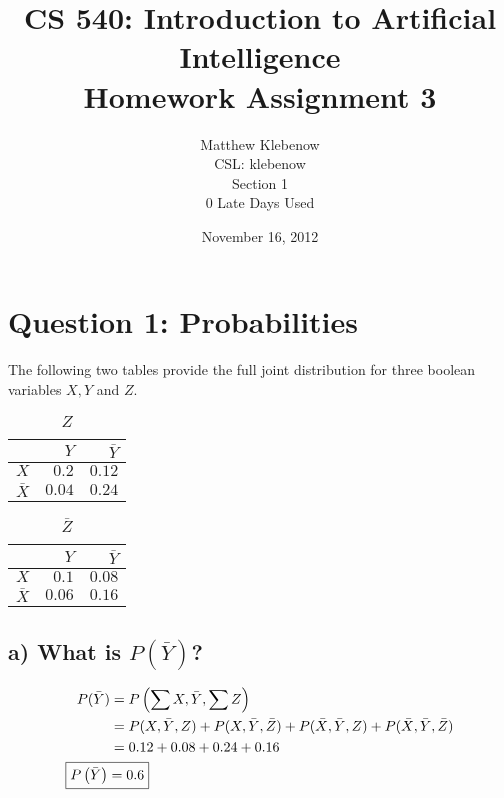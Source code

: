 \documentclass[12pt,letterpaper]{article}
\author{Matthew Klebenow\\CSL: klebenow\\Section 1\\0 Late Days Used}
\title{CS 540: Introduction to Artificial Intelligence \\ Homework Assignment 3}
\date{November 16, 2012}
\begin{document}
\maketitle
\tableofcontents
\pagebreak
\section{Question 1: Probabilities}
The following two tables provide the full joint distribution for three boolean variables $X,Y$ and $Z$.
\begin{table}[htbp]
  \centering
  \caption{$Z$}
    \begin{tabular}{rrr}
    \toprule
          & $Y$     & $\bar{Y}$ \\
    \midrule
    $X$     & $0.2$   & $0.12$ \\
    $\bar{X}$ & $0.04$  & $0.24$ \\
    \bottomrule
    \end{tabular}%
  \label{tab:ztable}%
\end{table}%
\begin{table}[htbp]
  \centering
  \caption{$\bar{Z}$}
    \begin{tabular}{rrr}
    \toprule
          & $Y$     & $\bar{Y}$ \\
    \midrule
    $X$     & $0.1$   & $0.08$ \\
    $\bar{X}$ & $0.06$  & $0.16$ \\
    \bottomrule
    \end{tabular}%
  \label{tab:notztable}%
\end{table}%
\subsection{a) What is $P\left(\bar{Y}\right)$?}
\begin{align*}
P(\bar{Y}) &= P\left(\sum{X},\bar{Y},\sum{Z}\right)\\
&= P(X,\bar{Y},Z) + P(X,\bar{Y},\bar{Z}) + P(\bar{X},\bar{Y},Z) + P(\bar{X},\bar{Y},\bar{Z})\\
&= 0.12 + 0.08 + 0.24 + 0.16\\
\Aboxed{P\left(\bar{Y}\right) &= 0.6}
%
\end{align*}
\end{document}
